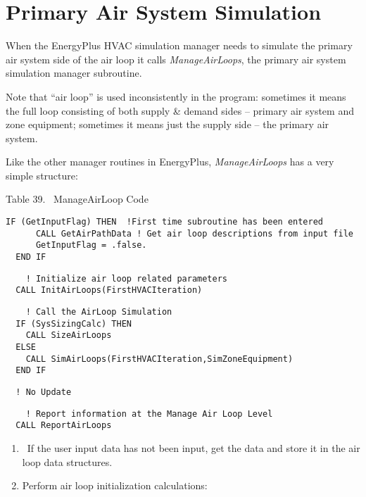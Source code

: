 \section{Primary Air System Simulation}\label{primary-air-system-simulation}

When the EnergyPlus HVAC simulation manager needs to simulate the primary air system side of the air loop it calls \emph{ManageAirLoops}, the primary air system simulation manager subroutine.

Note that ``air loop'' is used inconsistently in the program: sometimes it means the full loop consisting of both supply \& demand sides -- primary air system and zone equipment; sometimes it means just the supply side -- the primary air system.

Like the other manager routines in EnergyPlus, \emph{ManageAirLoops} has a very simple structure:

Table 39.~ ManageAirLoop Code

\begin{lstlisting}
IF (GetInputFlag) THEN  !First time subroutine has been entered
      CALL GetAirPathData ! Get air loop descriptions from input file
      GetInputFlag = .false.
  END IF
\end{lstlisting}

\begin{lstlisting}
    ! Initialize air loop related parameters
  CALL InitAirLoops(FirstHVACIteration)
\end{lstlisting}

\begin{lstlisting}
    ! Call the AirLoop Simulation
  IF (SysSizingCalc) THEN
    CALL SizeAirLoops
  ELSE
    CALL SimAirLoops(FirstHVACIteration,SimZoneEquipment)
  END IF
\end{lstlisting}

\begin{lstlisting}
  ! No Update
\end{lstlisting}

\begin{lstlisting}
    ! Report information at the Manage Air Loop Level
  CALL ReportAirLoops
\end{lstlisting}

\begin{enumerate}
\def\labelenumi{\arabic{enumi}.}
\item
  ~If the user input data has not been input, get the data and store it in the air loop data structures.
\item
  Perform air loop initialization calculations:
\end{enumerate}

